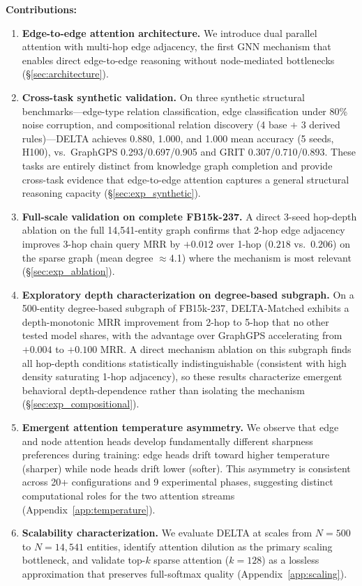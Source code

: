 \documentclass{article}
\begin{document}
\textbf{Contributions:}
\begin{enumerate}
    \item \textbf{Edge-to-edge attention architecture.} We introduce dual parallel attention with multi-hop edge adjacency, the first GNN mechanism that enables direct edge-to-edge reasoning without node-mediated bottlenecks (\S\ref{sec:architecture}).
    \item \textbf{Cross-task synthetic validation.} On three synthetic structural benchmarks---edge-type relation classification, edge classification under 80\% noise corruption, and compositional relation discovery (4 base $+$ 3 derived rules)---DELTA achieves 0.880, 1.000, and 1.000 mean accuracy (5 seeds, H100), vs.\ GraphGPS 0.293/0.697/0.905 and GRIT 0.307/0.710/0.893. These tasks are entirely distinct from knowledge graph completion and provide cross-task evidence that edge-to-edge attention captures a general structural reasoning capacity (\S\ref{sec:exp_synthetic}).
    \item \textbf{Full-scale validation on complete FB15k-237.} A direct 3-seed hop-depth ablation on the full 14,541-entity graph confirms that 2-hop edge adjacency improves 3-hop chain query MRR by $+0.012$ over 1-hop ($0.218$ vs.\ $0.206$) on the sparse graph (mean degree $\approx$4.1) where the mechanism is most relevant (\S\ref{sec:exp_ablation}).
    \item \textbf{Exploratory depth characterization on degree-based subgraph.} On a 500-entity degree-based subgraph of FB15k-237, DELTA-Matched exhibits a depth-monotonic MRR improvement from 2-hop to 5-hop that no other tested model shares, with the advantage over GraphGPS accelerating from $+0.004$ to $+0.100$ MRR. A direct mechanism ablation on this subgraph finds all hop-depth conditions statistically indistinguishable (consistent with high density saturating 1-hop adjacency), so these results characterize emergent behavioral depth-dependence rather than isolating the mechanism (\S\ref{sec:exp_compositional}).
    \item \textbf{Emergent attention temperature asymmetry.} We observe that edge and node attention heads develop fundamentally different sharpness preferences during training: edge heads drift toward higher temperature (sharper) while node heads drift lower (softer). This asymmetry is consistent across 20+ configurations and 9 experimental phases, suggesting distinct computational roles for the two attention streams (Appendix~\ref{app:temperature}).
    \item \textbf{Scalability characterization.} We evaluate DELTA at scales from $N{=}500$ to $N{=}14{,}541$ entities, identify attention dilution as the primary scaling bottleneck, and validate top-$k$ sparse attention ($k{=}128$) as a lossless approximation that preserves full-softmax quality (Appendix~\ref{app:scaling}).
\end{enumerate}
\end{document}
